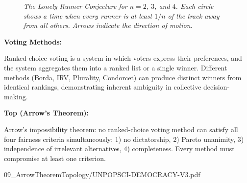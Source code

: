 \begin{figure}[H]
\centering
{}

\caption{\textit{The Lonely Runner Conjecture for $n = 2$, $3$, and $4$. Each circle shows a time when every runner is at least $1/n$ of the track away from all others. Arrows indicate the direction of motion.}}
\end{figure}

\begin{SideNotePage}{
  \textbf{Voting Methods:} \par Ranked-choice voting is a system in which voters express their preferences, and the system aggregates them into a ranked list or a single winner. Different methods (Borda, IRV, Plurality, Condorcet) can produce distinct winners from identical rankings, demonstrating inherent ambiguity in collective decision-making.

  \vspace{1.5em}
  \textbf{Top (Arrow's Theorem):} \par Arrow's impossibility theorem: no ranked-choice voting method can satisfy all four fairness criteria simultaneously: 1) no dictatorship, 2) Pareto unanimity, 3) independence of irrelevant alternatives, 4) completeness. Every method must compromise at least one criterion.
}{09_ArrowTheoremTopology/UNPOPSCI-DEMOCRACY-V3.pdf}
\end{SideNotePage}
